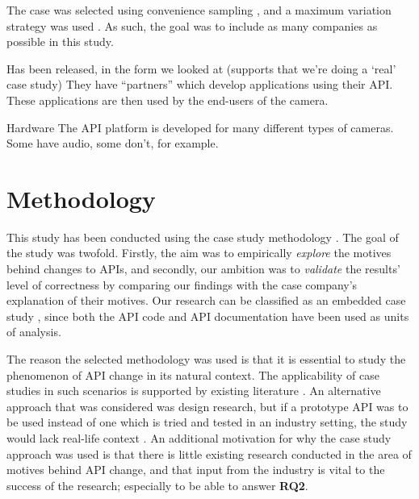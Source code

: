 \documentclass{sig-alternate}
\begin{document}

The case was selected using convenience sampling \cite{flyvbjerg2006five}, and a maximum variation strategy was used \cite{benbasat1987case}. As such, the goal was to include as many companies as possible in this study.


Has been released, in the form we looked at (supports that we’re doing a ‘real’ case study)
They have “partners” which develop applications using their API. These applications are then used by the end-users of the camera. 

Hardware
The API platform is developed for many different types of cameras. 
Some have audio, some don’t, for example.



\section{Methodology} \label{methodology}
This study has been conducted using the case study methodology \cite{runeson2009guidelines}. The goal of the study was twofold. Firstly, the aim was to empirically \textit{explore} the motives behind changes to APIs, and secondly, our ambition was to \textit{validate} the results' level of correctness by comparing our findings with the case company's explanation of their motives. Our research can be classified as an embedded case study \cite{yin2013case}, since both the API code and API documentation have been used as units of analysis. 

The reason the selected methodology was used is that it is essential to study the phenomenon of API change in its natural context. The applicability of case studies in such scenarios is supported by existing literature \cite{benbasat1987case} \cite{runeson2009guidelines} \cite{yin2013case} \cite{robson2002real}. An alternative approach that was considered was design research, but if a prototype API was to be used instead of one which is tried and tested in an industry setting, the study would lack real-life context \cite{runeson2009guidelines}. An additional motivation for why the case study approach was used is that there is little existing research conducted in the area of motives behind API change, and that input from the industry is vital to the success of the research; especially to be able to answer \textbf{RQ2}. 
\end{document}
